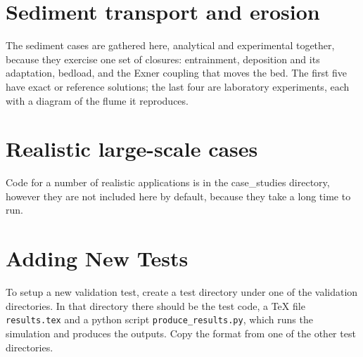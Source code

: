 \documentclass[11pt,a4paper]{report}
\begin{document}


\chapter{Sediment transport and erosion} \label{ch:sediment}

The sediment cases are gathered here, analytical and experimental together,
because they exercise one set of closures: entrainment, deposition and its
adaptation, bedload, and the Exner coupling that moves the bed. The first
five have exact or reference solutions; the last four are laboratory
experiments, each with a diagram of the flume it reproduces.



\chapter{Realistic large-scale cases} \label{ch:casestudy}
Code for a number of realistic applications is in the case\_studies directory,
however they are not included here by default, because they take a long time to
run.

\appendix
\chapter{Adding New Tests}


To setup a new validation test, create a test directory under one of
the validation directories. In that directory there should be the test code, a
\TeX{} file \texttt{results.tex} and a python script
\texttt{produce\_results.py}, which runs the simulation and produces the
outputs. Copy the format from one of the other test directories.
\end{document}
